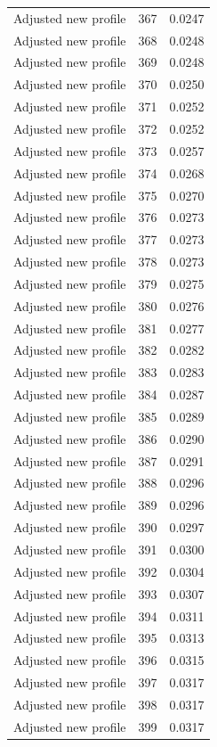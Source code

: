 \begin{table}[htbp]
\begin{tabular}{lll}
Adjusted new profile & 367 & 0.0247 \\
Adjusted new profile & 368 & 0.0248 \\
Adjusted new profile & 369 & 0.0248 \\
Adjusted new profile & 370 & 0.0250 \\
Adjusted new profile & 371 & 0.0252 \\
Adjusted new profile & 372 & 0.0252 \\
Adjusted new profile & 373 & 0.0257 \\
Adjusted new profile & 374 & 0.0268 \\
Adjusted new profile & 375 & 0.0270 \\
Adjusted new profile & 376 & 0.0273 \\
Adjusted new profile & 377 & 0.0273 \\
Adjusted new profile & 378 & 0.0273 \\
Adjusted new profile & 379 & 0.0275 \\
Adjusted new profile & 380 & 0.0276 \\
Adjusted new profile & 381 & 0.0277 \\
Adjusted new profile & 382 & 0.0282 \\
Adjusted new profile & 383 & 0.0283 \\
Adjusted new profile & 384 & 0.0287 \\
Adjusted new profile & 385 & 0.0289 \\
Adjusted new profile & 386 & 0.0290 \\
Adjusted new profile & 387 & 0.0291 \\
Adjusted new profile & 388 & 0.0296 \\
Adjusted new profile & 389 & 0.0296 \\
Adjusted new profile & 390 & 0.0297 \\
Adjusted new profile & 391 & 0.0300 \\
Adjusted new profile & 392 & 0.0304 \\
Adjusted new profile & 393 & 0.0307 \\
Adjusted new profile & 394 & 0.0311 \\
Adjusted new profile & 395 & 0.0313 \\
Adjusted new profile & 396 & 0.0315 \\
Adjusted new profile & 397 & 0.0317 \\
Adjusted new profile & 398 & 0.0317 \\
Adjusted new profile & 399 & 0.0317 \\

\end{tabular}
\end{table}
